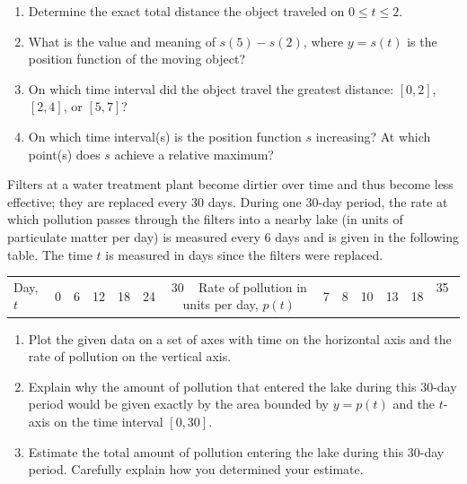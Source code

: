 \begin{exercises}
 \begin{enumerate}
 	\item Determine the exact total distance the object traveled on $0 \le t \le 2$.
	\item What is the value and meaning of $s(5) - s(2)$, where $y = s(t)$ is the position function of the moving object?
	\item On which time interval did the object travel the greatest distance: $[0,2]$, $[2,4]$, or $[5,7]$?
	\item On which time interval(s) is the position function $s$ increasing?  At which point(s) does $s$ achieve a relative maximum?
 \end{enumerate}
  \item Filters at a water treatment plant become dirtier over time and thus become less effective; they are replaced every 30 days.  During one 30-day period, the rate at which pollution passes through the filters into a nearby lake (in units of particulate matter per day) is measured every 6 days and is given in the following table.  The time $t$  is measured in days since the filters were replaced.
\begin{center}
\begin{tabular}{|l|c|c|c|c|c|c|}
\hline
Day, $t$ & 0 & 6 & 12 &	18 & 24 & 30 \
\hline
Rate of pollution in units per day, $p(t)$ & 7 & 8 & 10 &	13 & 18 & 35 \
\hline
\end{tabular}
\end{center}
\begin{enumerate}
	\item Plot the given data on a set of axes with time on the horizontal axis and the rate of pollution on the vertical axis.
	\item Explain why the amount of pollution that entered the lake during this 30-day period would be given exactly by the area bounded by $y = p(t)$ and the $t$-axis on the time interval $[0,30]$.
	\item Estimate the total amount of pollution entering the lake during this 30-day period.  Carefully explain how you determined your estimate.
\end{enumerate}
\end{exercises}
\afterexercises

\clearpage
